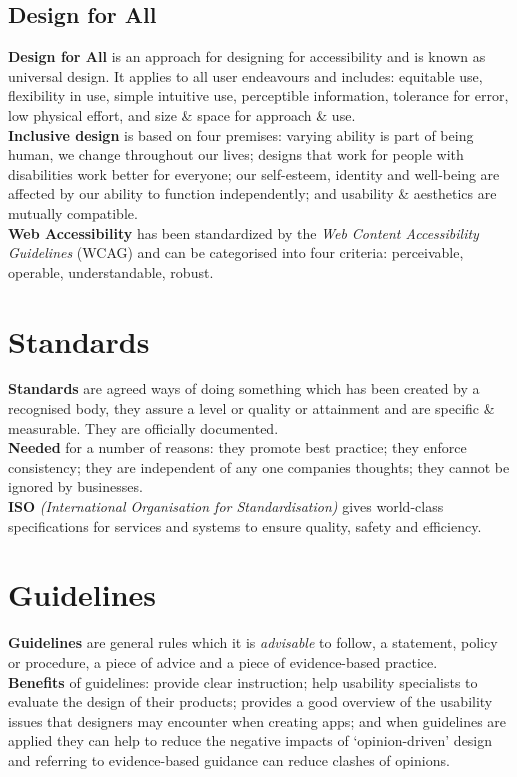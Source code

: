 \documentclass[a4paper,11pt]{article}
\begin{document}
\subsection{Design for All}
\textbf{Design for All} is an approach for designing for accessibility and is known as universal design. It applies to all user endeavours and includes: equitable use, flexibility in use, simple intuitive use, perceptible information, tolerance for error, low physical effort, and size \& space for approach \& use.\\
\textbf{Inclusive design} is based on four premises: varying ability is part of being human, we change throughout our lives; designs that work for people with disabilities work better for everyone; our self-esteem, identity and well-being are affected by our ability to function independently; and usability \& aesthetics are mutually compatible.\\
\textbf{Web Accessibility} has been standardized by the \textit{Web Content Accessibility Guidelines} (WCAG) and can be categorised into four criteria: perceivable, operable, understandable, robust.

\section{Standards}
\textbf{Standards} are agreed ways of doing something which has been created by a recognised body, they assure a level or quality or attainment and are specific \& measurable. They are officially documented.\\
\textbf{Needed} for a number of reasons: they promote best practice; they enforce consistency; they are independent of any one companies thoughts; they cannot be ignored by businesses.\\
\textbf{ISO} \textit{(International Organisation for Standardisation)} gives world-class specifications for services and systems to ensure quality, safety and efficiency. 

\section{Guidelines}
\textbf{Guidelines} are general rules which it is \textit{advisable} to follow, a statement, policy or procedure, a piece of advice and a piece of evidence-based practice. \\
\textbf{Benefits} of guidelines: provide clear instruction; help usability specialists to evaluate the design of their products; provides a good overview of the usability issues that designers may encounter when creating apps; and when guidelines are applied they can help to reduce the negative impacts of `opinion-driven' design and referring to evidence-based guidance can reduce clashes of opinions.
\end{document}
